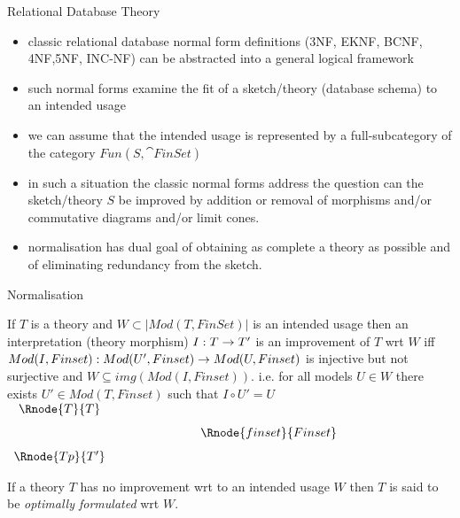 \begin{frame}{Relational Database Theory}
\begin{itemize}
\item classic relational database normal form definitions ({\scriptsize 3NF, EKNF, BCNF, 4NF,5NF, INC-NF}) can be abstracted  into a general logical framework

\item such normal forms  examine the fit of a sketch/theory (database schema) to an intended usage

\item we can assume that the intended usage is represented by a full-subcategory of the category $Fun(S,\cat{FinSet})$

\item in such a situation the classic normal forms address the question can the sketch/theory $S$ be improved by addition or removal of morphisms and/or commutative diagrams and/or limit cones.
\item normalisation has dual goal of obtaining as complete a theory as possible and of eliminating redundancy from the sketch.  
\end{itemize}
\end{frame}



\iffalse %
\begin{frame}{Normalisation}
\begin{definition}
{ \footnotesize
If $T$ is a theory and $W \subset |Mod(T,FinSet)|$ is an intended usage then an interpretation (theory morphism) $I: T \rightarrow T'$ is an improvement of $T$ wrt $W$ iff 
$Mod(I,Finset): Mod(U',Finset) \rightarrow Mod(U,Finset)$ is injective but not surjective
and $W \subseteq img(Mod(I,Finset))$.
i.e. for all models $U \in W$ there exists $U' \in Mod(T,Finset)$ such that $I \circ U'=U$
$
\begin{array} {c p{2cm} c}
\Rnode{T}{T} && \\ [0.25cm]
             && \Rnode{finset}{Finset} \\ [0.25cm]
\Rnode{Tp}{T'}  
\end{array}
$
}
\end{definition}

\begin{definition}
If a theory $T$ has no improvement wrt to an intended usage $W$ then $T$ is said to be \textit{optimally formulated} wrt $W$.
\end{definition}
\end{frame}


